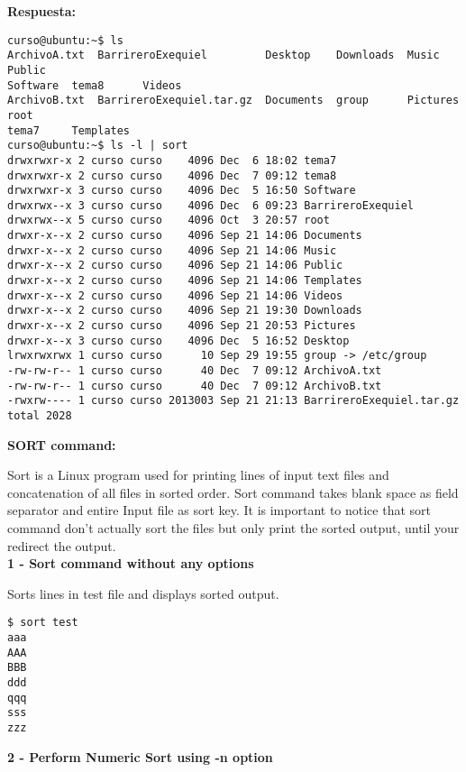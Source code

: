 \documentclass[a4paper,11pt,spanish]{article} %
\newenvironment{myscriptlisting}
{\begin{list}{}{\setlength{\leftmargin}{1em}}\item\scriptsize\bfseries}
{\end{list}}
\begin{document}
\textbf{Respuesta:}

\begin{myscriptlisting}
 \begin{verbatim}
curso@ubuntu:~$ ls
ArchivoA.txt  BarrireroExequiel         Desktop    Downloads  Music     Public
Software  tema8      Videos
ArchivoB.txt  BarrireroExequiel.tar.gz  Documents  group      Pictures  root
tema7     Templates
curso@ubuntu:~$ ls -l | sort
drwxrwxr-x 2 curso curso    4096 Dec  6 18:02 tema7
drwxrwxr-x 2 curso curso    4096 Dec  7 09:12 tema8
drwxrwxr-x 3 curso curso    4096 Dec  5 16:50 Software
drwxrwx--x 3 curso curso    4096 Dec  6 09:23 BarrireroExequiel
drwxrwx--x 5 curso curso    4096 Oct  3 20:57 root
drwxr-x--x 2 curso curso    4096 Sep 21 14:06 Documents
drwxr-x--x 2 curso curso    4096 Sep 21 14:06 Music
drwxr-x--x 2 curso curso    4096 Sep 21 14:06 Public
drwxr-x--x 2 curso curso    4096 Sep 21 14:06 Templates
drwxr-x--x 2 curso curso    4096 Sep 21 14:06 Videos
drwxr-x--x 2 curso curso    4096 Sep 21 19:30 Downloads
drwxr-x--x 2 curso curso    4096 Sep 21 20:53 Pictures
drwxr-x--x 3 curso curso    4096 Dec  5 16:52 Desktop
lrwxrwxrwx 1 curso curso      10 Sep 29 19:55 group -> /etc/group
-rw-rw-r-- 1 curso curso      40 Dec  7 09:12 ArchivoA.txt
-rw-rw-r-- 1 curso curso      40 Dec  7 09:12 ArchivoB.txt
-rwxrw---- 1 curso curso 2013003 Sep 21 21:13 BarrireroExequiel.tar.gz
total 2028
 \end{verbatim}
\end{myscriptlisting}

\textbf{SORT command:}

Sort is a Linux program used for printing lines of input text files and concatenation
of all files in sorted order. Sort command takes blank space as field separator and
entire Input file as sort key. It is important to notice that sort command don’t actually
sort the files but only print the sorted output, until your redirect the output.\\

\textbf{1 - Sort command without any options}

Sorts lines in test file and displays sorted output.

\begin{myscriptlisting}
 \begin{verbatim}
$ sort test
aaa
AAA
BBB
ddd
qqq
sss
zzz
\end{verbatim}
\end{myscriptlisting}

\textbf{2 - Perform Numeric Sort using -n option}
\end{document}
